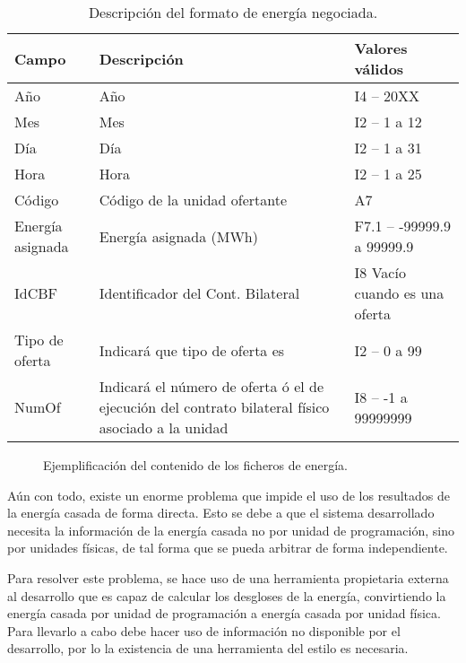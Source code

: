 \begin{table}[ht]
  \centering
  \begin{tabular}{|l|p{5cm}|l|}
    \hline
    Campo & Descripción & Valores válidos\\
    \hline
    Año & Año & I4 -- 20XX\\
    Mes & Mes & I2 -- 1 a 12\\
    Día & Día & I2 -- 1 a 31\\
    Hora & Hora & I2 -- 1 a 25\\
    Código & Código de la unidad ofertante & A7\\
    Energía asignada & Energía asignada (MWh) & F7.1 – -99999.9 a 99999.9\\
    IdCBF & Identificador del Cont. Bilateral & I8 Vacío cuando es una oferta\\
    Tipo de oferta & Indicará que tipo de oferta es & I2 – 0 a 99\\
    NumOf & Indicará el número de oferta ó el de ejecución del contrato bilateral físico asociado a la unidad & I8 – -1 a 99999999\\
    \hline
  \end{tabular}
  \caption{Descripción del formato de energía negociada.}
  \label{tab:descripción-energia}
\end{table}

\begin{figure}
  \centering
  \caption{Ejemplificación del contenido de los ficheros de energía.}
  \label{fig:contenido-energia}
\end{figure}

Aún con todo, existe un enorme problema que impide el uso de los resultados de la energía casada de forma directa. Esto se debe a que el sistema desarrollado necesita la información de la energía casada no por unidad de programación, sino por unidades físicas, de tal forma que se pueda arbitrar de forma independiente.

Para resolver este problema, se hace uso de una herramienta propietaria externa al desarrollo que es capaz de calcular los desgloses de la energía, convirtiendo la energía casada por unidad de programación a energía casada por unidad física. Para llevarlo a cabo debe hacer uso de información no disponible por el desarrollo, por lo la existencia de una herramienta del estilo es necesaria.

